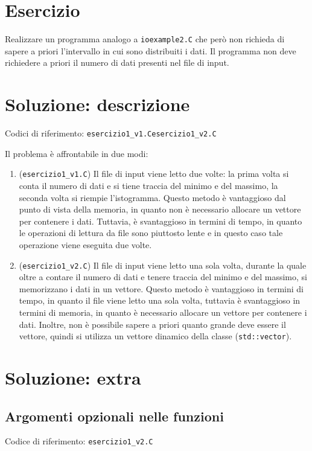 \documentclass[10pt]{article}
\newcommand{\ttt}{\texttt}
\begin{document}
\newpage

\section{Esercizio}

Realizzare un programma analogo a \ttt{ioexample2.C} che però non richieda di sapere a priori l'intervallo in cui sono distribuiti i dati.
Il programma non deve richiedere a priori il numero di dati presenti nel file di input.

\section{Soluzione: descrizione}
Codici di riferimento: \ttt{esercizio1\_v1.C}\hspace{10pt}\ttt{esercizio1\_v2.C} \vspace{10pt}

Il problema è affrontabile in due modi:
\begin{enumerate}
    \item (\ttt{esercizio1\_v1.C}) Il file di input viene letto due volte: la prima volta si conta il numero di dati e si tiene traccia del minimo e del massimo, la seconda volta si riempie l'istogramma.
        Questo metodo è vantaggioso dal punto di vista della memoria, in quanto non è necessario allocare un vettore per contenere i dati.
        Tuttavia, è svantaggioso in termini di tempo, in quanto le operazioni di lettura da file sono piuttosto lente e in questo caso tale operazione viene eseguita due volte.
    \item (\ttt{esercizio1\_v2.C}) Il file di input viene letto una sola volta, durante la quale oltre a contare il numero di dati e tenere traccia del minimo e del massimo, si memorizzano i dati in un vettore.
        Questo metodo è vantaggioso in termini di tempo, in quanto il file viene letto una sola volta, tuttavia è svantaggioso in termini di memoria, in quanto è necessario allocare un vettore per contenere i dati.
        Inoltre, non è possibile sapere a priori quanto grande deve essere il vettore, quindi si utilizza un vettore dinamico della classe (\ttt{std::vector}).
\end{enumerate}

\section{Soluzione: extra}
\subsection{Argomenti opzionali nelle funzioni}
Codice di riferimento: \ttt{esercizio1\_v2.C} \vspace{10pt}
\end{document}
